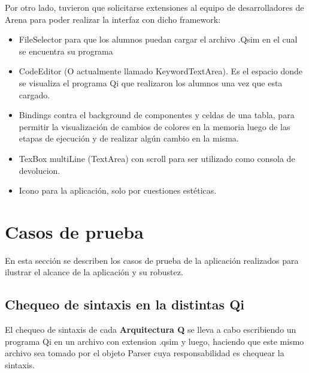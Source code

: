 Por otro lado, tuvieron que solicitarse extensiones al equipo de desarrolladores de Arena para poder realizar la interfaz con dicho framework:

\begin{itemize}
\item FileSelector para que los alumnos puedan cargar el archivo .Qsim en el cual se encuentra su programa
\item CodeEditor (O actualmente llamado KeywordTextArea). Es el espacio donde se visualiza el programa Qi que realizaron los alumnos una vez que esta cargado.
\item Bindings contra el background de componentes y celdas de una tabla, para permitir la visualización de cambios de colores en la memoria luego de las etapas de ejecución y de realizar algún cambio en la misma.
\item TexBox multiLine (TextArea) con scroll para ser utilizado como consola de devolucion.
\item Icono para la aplicación, solo por cuestiones estéticas.
\end{itemize}

\section{Casos de prueba}

En esta sección se describen los casos de prueba de la aplicación realizados para ilustrar el alcance de la aplicación y su robustez.

\subsection{Chequeo de sintaxis en la distintas Qi}

El chequeo de sintaxis de cada \textbf{Arquitectura Q} se lleva a cabo escribiendo un programa Qi en un archivo con extension .qsim y luego, haciendo que este mismo archivo sea tomado por el objeto Parser cuya responsabilidad es chequear la sintaxis. 

